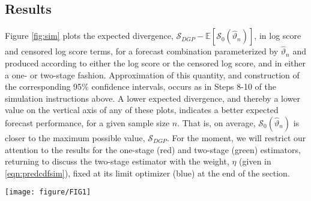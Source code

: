 \documentclass[12pt]{article}
\theoremstyle{definition}
\theoremstyle{remark}
\begin{document}
\subsection{Results \label{subsec:montecarloresults}}

Figure \ref{fig:sim} plots the expected divergence, $\mathcal{S}_{DGP} - \mathbb{E}[\mathcal{S}_0(\hat{\vartheta}_n)]$, in log score and censored log score terms, for a forecast combination parameterized by $\hat{\vartheta}_n$ and produced according to either the log score or the censored log score, and in either a one- or two-stage fashion. Approximation of this quantity, and construction of the corresponding 95\% confidence intervals, occurs as in Steps 8-10 of the simulation instructions above. A lower expected divergence, and thereby a lower value on the vertical axis of any of these plots, indicates a better expected forecast performance, for a given sample size $n$. That is, on average, $\mathcal{S}_0(\hat{\vartheta}_n)$ is closer to the maximum possible value, $\mathcal{S}_{DGP}$. For the moment, we will restrict our attention to the results for the one-stage (red) and two-stage (green) estimators, returning to discuss the two-stage estimator with the weight, $\eta$ (given in \eqref{eqn:predcdfsim}), fixed at its limit optimizer (blue) at the end of the section.

\begin{figure*}[t]
\texttt{[image: figure/FIG1]}
\caption{The expectation of the difference between the out-of-sample one-step-ahead forecast performance of a misspecified forecast combination and that of the true DGP, over a range of sample sizes. \cite{Gneiting2007} call this quantity the expected divergence. The forecast combination is optimized in a one-stage fashion (red), a two-stage fashion (green) or in a way that comprises the first stage of the two-stage combination, followed by a fixed combination at $\tilde{\eta}_n = \eta^{\star}$ (blue). Parameters are optimized according to the log score (A and C, first column) or a censored log score that prioritizes accuracy in the lower 20\% tail of the forecast distribution (B and D, second column). The divergence is measured on the vertical axes according to the log score (A and B, first row) or the censored log score (C and D, second row). The expectations and confidence intervals are constructed as per Steps 8-10 in the text, with the 95\% confidence bounds appearing as small dashed lines.}
\label{fig:sim}
\end{figure*}
\end{document}
